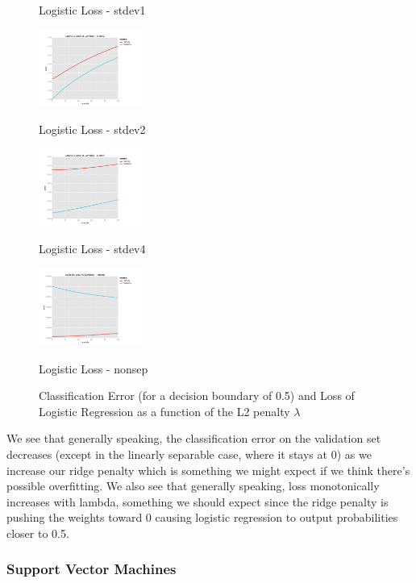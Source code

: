 \documentclass[10pt]{article}
\begin{document}
\begin{figure}[ht]
\begin{minipage}[b]{.24\linewidth}
		\caption*{Logistic Loss - stdev1}
	\end{minipage}
	\begin{minipage}[b]{.24\linewidth}
		\includegraphics[width=1\linewidth, height=1in]{Loss_lambda_stdev2.png}
		\caption*{Logistic Loss - stdev2}
	\end{minipage}
	\begin{minipage}[b]{.24\linewidth}
		\includegraphics[width=1\linewidth, height=1in]{Loss_lambda_stdev4.png}
		\caption*{Logistic Loss - stdev4}
	\end{minipage}
	\begin{minipage}[b]{.24\linewidth}
		\includegraphics[width=1\linewidth, height=1in]{Loss_lambda_nonsep.png}
		\caption*{Logistic Loss - nonsep}
	\end{minipage}
	\caption{Classification Error (for a decision boundary of 0.5) and Loss of Logistic Regression as a function of the L2 penalty $\lambda$}
\end{figure}

We see that generally speaking, the classification error on the validation set decreases (except in the linearly separable case, where it stays at 0) as we increase our ridge penalty which is something we might expect if we think there's possible overfitting. We also see that generally speaking, loss monotonically increases with lambda, something we should expect since the ridge penalty is pushing the weights toward 0 causing logistic regression to output probabilities closer to 0.5.

\subsubsection*{Support Vector Machines}
\end{document}
